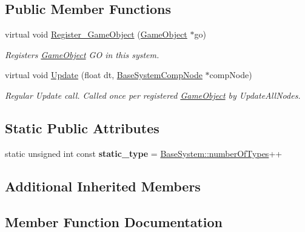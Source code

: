 \subsection*{Public Member Functions}
\begin{DoxyCompactItemize}
\item 
virtual void \hyperlink{classAnimationSystem_a887b7a3f1fa8d9c425b6ba49e12a3ca4}{Register\+\_\+\+Game\+Object} (\hyperlink{classGameObject}{Game\+Object} $\ast$go)
\begin{DoxyCompactList}\small\item\em Registers \hyperlink{classGameObject}{Game\+Object} GO in this system. \end{DoxyCompactList}\item 
virtual void \hyperlink{classAnimationSystem_aa74600f86761b9bb47a0689665901a49}{Update} (float dt, \hyperlink{structBaseSystemCompNode}{Base\+System\+Comp\+Node} $\ast$comp\+Node)
\begin{DoxyCompactList}\small\item\em Regular Update call. Called once per registered \hyperlink{classGameObject}{Game\+Object} by Update\+All\+Nodes. \end{DoxyCompactList}\end{DoxyCompactItemize}
\subsection*{Static Public Attributes}
\begin{DoxyCompactItemize}
\item 
\mbox{\label{classAnimationSystem_a288581c9524350d393f2a93e5aeb3165}} 
static unsigned int const {\bfseries static\+\_\+type} = \hyperlink{classBaseSystem_a7ef356edab3cfb02905e0a73a645b131}{Base\+System\+::number\+Of\+Types}++
\end{DoxyCompactItemize}
\subsection*{Additional Inherited Members}


\subsection{Member Function Documentation}
\mbox{\label{classAnimationSystem_a887b7a3f1fa8d9c425b6ba49e12a3ca4}} 
